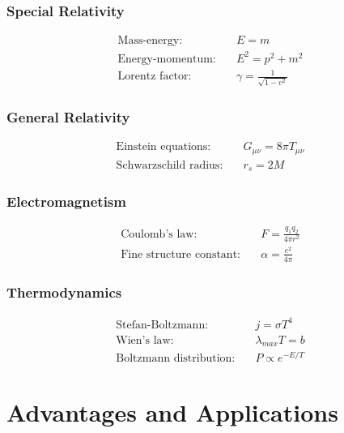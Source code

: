 \documentclass[11pt,a4paper]{article}
\begin{document}
	\subsubsection{Special Relativity}
	\begin{align}
		\text{Mass-energy:} \quad & E = m \\
		\text{Energy-momentum:} \quad & E^2 = p^2 + m^2 \\
		\text{Lorentz factor:} \quad & \gamma = \frac{1}{\sqrt{1-v^2}}
	\end{align}
	
	\subsubsection{General Relativity}
	\begin{align}
		\text{Einstein equations:} \quad & G_{\mu\nu} = 8\pi T_{\mu\nu} \\
		\text{Schwarzschild radius:} \quad & r_s = 2M
	\end{align}
	
	\subsubsection{Electromagnetism}
	\begin{align}
		\text{Coulomb's law:} \quad & F = \frac{q_1 q_2}{4\pi r^2} \\
		\text{Fine structure constant:} \quad & \alpha = \frac{e^2}{4\pi}
	\end{align}
	
	\subsubsection{Thermodynamics}
	\begin{align}
		\text{Stefan-Boltzmann:} \quad & j = \sigma T^4 \\
		\text{Wien's law:} \quad & \lambda_{max} T = b \\
		\text{Boltzmann distribution:} \quad & P \propto e^{-E/T}
	\end{align}
	
	\section{Advantages and Applications}
	
\end{document}

